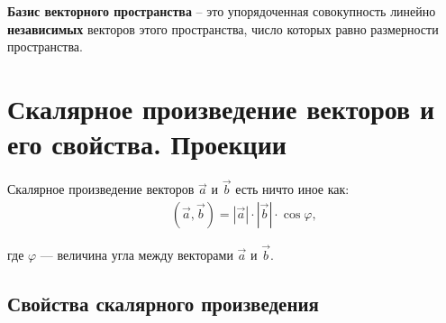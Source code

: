 \documentclass[12pt, fleqn]{extarticle}
\begin{document}
\textbf{Базис векторного пространства} – это упорядоченная совокупность линейно \textbf{независимых} векторов этого пространства, число которых равно размерности пространства.

\newpage

\section{Скалярное произведение векторов и его свойства. Проекции}

Скалярное произведение векторов \(\overrightarrow{a}\) и \(\overrightarrow{b}\) есть ничто иное как:
\begin{align*}
     &  &
    (\overrightarrow{a}, \overrightarrow{b}) = |\overrightarrow{a}| \cdot |\overrightarrow{b}| \cdot \cos{\varphi},
\end{align*}

где \(\varphi\) — величина угла между векторами \(\overrightarrow{a}\) и \(\overrightarrow{b}\).

\subsection*{Свойства скалярного произведения}
\end{document}
